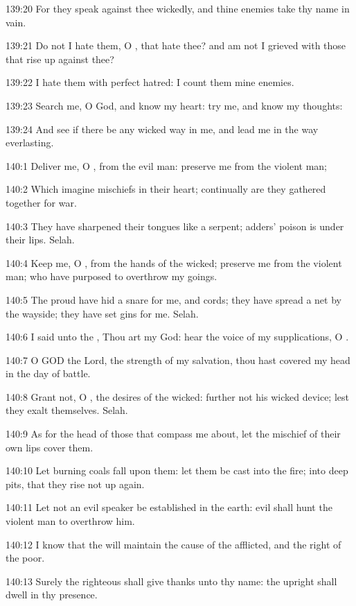139:20 For they speak against thee wickedly, and thine enemies take thy name in vain.

139:21 Do not I hate them, O \LORD, that hate thee? and am not I grieved with those that rise up against thee?

139:22 I hate them with perfect hatred: I count them mine enemies.

139:23 Search me, O God, and know my heart: try me, and know my thoughts:

139:24 And see if there be any wicked way in me, and lead me in the way everlasting.



140:1 Deliver me, O \LORD, from the evil man: preserve me from the violent man;

140:2 Which imagine mischiefs in their heart; continually are they gathered together for war.

140:3 They have sharpened their tongues like a serpent; adders' poison is under their lips. Selah.

140:4 Keep me, O \LORD, from the hands of the wicked; preserve me from the violent man; who have purposed to overthrow my goings.

140:5 The proud have hid a snare for me, and cords; they have spread a net by the wayside; they have set gins for me. Selah.

140:6 I said unto the \LORD, Thou art my God: hear the voice of my supplications, O \LORD.

140:7 O GOD the Lord, the strength of my salvation, thou hast covered my head in the day of battle.

140:8 Grant not, O \LORD, the desires of the wicked: further not his wicked device; lest they exalt themselves. Selah.

140:9 As for the head of those that compass me about, let the mischief of their own lips cover them.

140:10 Let burning coals fall upon them: let them be cast into the fire; into deep pits, that they rise not up again.

140:11 Let not an evil speaker be established in the earth: evil shall hunt the violent man to overthrow him.

140:12 I know that the \LORD will maintain the cause of the afflicted, and the right of the poor.

140:13 Surely the righteous shall give thanks unto thy name: the upright shall dwell in thy presence.



